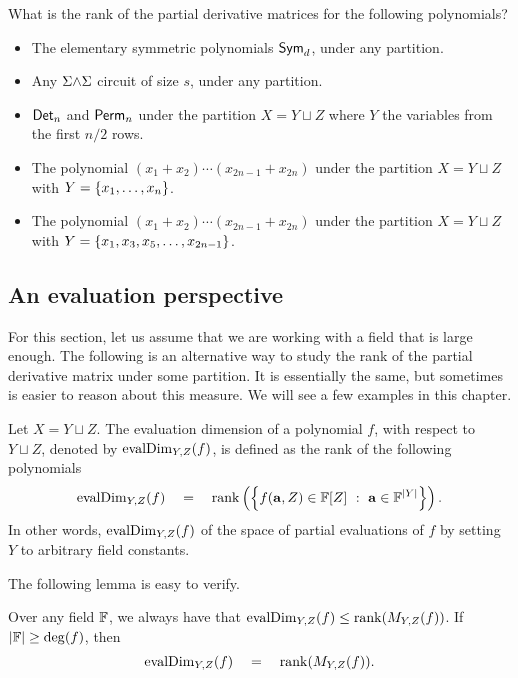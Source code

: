\begin{exercise}\label{ex:pdm-rank}
What is the rank of the partial derivative matrices for the following polynomials? 
\begin{itemize}
\item The elementary symmetric polynomials $\operatorname{\mathsf{Sym}}_d$, under any partition.
\item Any $\Sigma\mathord{\wedge}\Sigma$ circuit of size $s$, under any partition.
\item $\operatorname{\mathsf{Det}}_n$ and $\operatorname{\mathsf{Perm}}_n$ under the partition $X = Y \sqcup Z$ where $Y$ the variables from the first $n/2$ rows. 
\item The polynomial $(x_1 + x_2) \cdots (x_{2n-1} + x_{2n})$ under the partition $X = Y \sqcup Z$ with $Y = \left\{x_1,\ldots, x_n\right\}$. 
\item The polynomial $(x_1 + x_2) \cdots (x_{2n-1} + x_{2n})$ under the partition $X = Y \sqcup Z$ with $Y = \left\{x_1,x_3,x_5,\ldots, x_{2n-1}\right\}$. 
\end{itemize}
\end{exercise}

\subsection{An evaluation perspective}

For this section, let us assume that we are working with a field that is large enough. The following is an alternative
way to study the rank of the partial derivative matrix under some partition. It is essentially the same, but sometimes
is easier to reason about this measure. We will see a few examples in this chapter.

\begin{definition}
Let $X = Y \sqcup Z$. The evaluation dimension of a polynomial $f$, with respect to $Y \sqcup Z$, denoted by $\operatorname{evalDim}_{Y,Z}(f)$,  is defined as the rank of the following polynomials
\[
\operatorname{evalDim}_{Y,Z}(f) \quad = \quad \operatorname{rank}\left(\left\{{f(\mathbf{a}, Z) \in \mathbb{F}[Z]}\ : \ {\mathbf{a} \in \mathbb{F}^{|Y|}}\right\}\right). 
\]
In other words, $\operatorname{evalDim}_{Y,Z}(f)$ of the space of partial evaluations of $f$ by setting $Y$ to arbitrary field constants. 
\end{definition}

\noindent 
The following lemma is easy to verify.

\begin{lemma}\label{lem:evalDim-to-coeffDim}
Over any field $\mathbb{F}$, we always have that $\operatorname{evalDim}_{Y,Z}(f) \leq \operatorname{rank}(M_{Y,Z}(f))$. If $|\mathbb{F}| \geq \deg(f)$, then
\[
\operatorname{evalDim}_{Y,Z}(f) \quad = \quad \operatorname{rank}(M_{Y,Z}(f)).
\]
\end{lemma}

